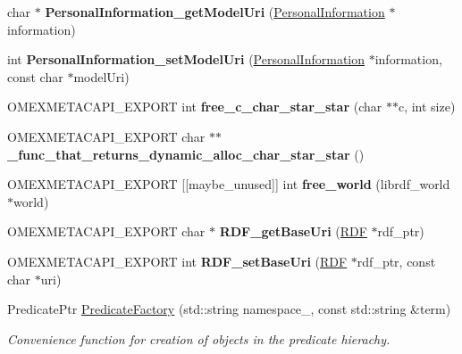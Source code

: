 \begin{DoxyCompactItemize}
\item 
\mbox{\label{namespaceomexmeta_a7a1a593f975f9b4c81a6f4b762eacb97}} 
char $\ast$ {\bfseries Personal\+Information\+\_\+get\+Model\+Uri} (\hyperlink{classomexmeta_1_1PersonalInformation}{Personal\+Information} $\ast$information)
\item 
\mbox{\label{namespaceomexmeta_af1b8bfaffdb6766ddaf1f52785436980}} 
int {\bfseries Personal\+Information\+\_\+set\+Model\+Uri} (\hyperlink{classomexmeta_1_1PersonalInformation}{Personal\+Information} $\ast$information, const char $\ast$model\+Uri)
\item 
\mbox{\label{namespaceomexmeta_ae46820e98812e5f7e15fba6c2fa5ea55}} 
O\+M\+E\+X\+M\+E\+T\+A\+C\+A\+P\+I\+\_\+\+E\+X\+P\+O\+RT int {\bfseries free\+\_\+c\+\_\+char\+\_\+star\+\_\+star} (char $\ast$$\ast$c, int size)
\item 
\mbox{\label{namespaceomexmeta_ada1c39e1f5456668968eabe1a0ff33ec}} 
O\+M\+E\+X\+M\+E\+T\+A\+C\+A\+P\+I\+\_\+\+E\+X\+P\+O\+RT char $\ast$$\ast$ {\bfseries \+\_\+func\+\_\+that\+\_\+returns\+\_\+dynamic\+\_\+alloc\+\_\+char\+\_\+star\+\_\+star} ()
\item 
\mbox{\label{namespaceomexmeta_a273e4922a97b016e54bbb441c23de885}} 
O\+M\+E\+X\+M\+E\+T\+A\+C\+A\+P\+I\+\_\+\+E\+X\+P\+O\+RT \mbox{[}\mbox{[}maybe\+\_\+unused\mbox{]}\mbox{]} int {\bfseries free\+\_\+world} (librdf\+\_\+world $\ast$world)
\item 
\mbox{\label{namespaceomexmeta_a5d07b1a3b03615813dbb9efb62efda45}} 
O\+M\+E\+X\+M\+E\+T\+A\+C\+A\+P\+I\+\_\+\+E\+X\+P\+O\+RT char $\ast$ {\bfseries R\+D\+F\+\_\+get\+Base\+Uri} (\hyperlink{classomexmeta_1_1RDF}{R\+DF} $\ast$rdf\+\_\+ptr)
\item 
\mbox{\label{namespaceomexmeta_a64ae848c4570f1efb4d47e795b76adcd}} 
O\+M\+E\+X\+M\+E\+T\+A\+C\+A\+P\+I\+\_\+\+E\+X\+P\+O\+RT int {\bfseries R\+D\+F\+\_\+set\+Base\+Uri} (\hyperlink{classomexmeta_1_1RDF}{R\+DF} $\ast$rdf\+\_\+ptr, const char $\ast$uri)
\item 
Predicate\+Ptr \hyperlink{namespaceomexmeta_a0a8d50daa10e421d0722520cdef0ab9a}{Predicate\+Factory} (std\+::string namespace\+\_\+, const std\+::string \&term)
\begin{DoxyCompactList}\small\item\em Convenience function for creation of objects in the predicate hierachy. \end{DoxyCompactList}\end{DoxyCompactItemize}


